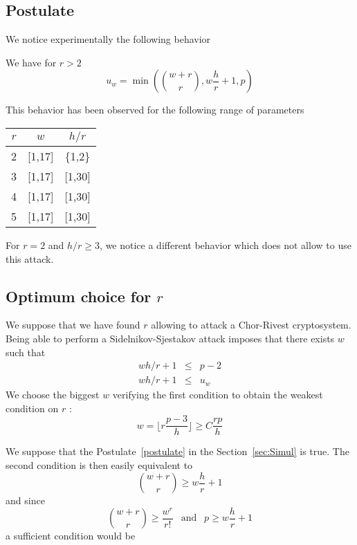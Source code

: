 \documentclass[a4paper]{article}
\begin{document}
\subsection{Postulate}

We notice experimentally the following behavior

\begin{postulate}
\label{postulate}
We have for $r > 2$
$$ u_w = \min \left( \binom{w+r}{r}, w\frac{h}{r} + 1 , p \right)$$
\end{postulate}

This behavior has been observed for the following range of parameters
\begin{center}
\begin{tabular}{|c|c|c|}
\hline
$r$ & $w$ 	& $h/r$ \\
\hline
2	& [1,17]	& \{1,2\}	\\
\hline
3	& [1,17]	& [1,30] \\
\hline
4	& [1,17]	& [1,30] \\
\hline
5	& [1,17]	& [1,30] \\
\hline
\end{tabular}
\end{center}


For $r = 2$ and $h/r \geq 3$, we notice a different behavior which does not allow to use this attack.


\subsection{Optimum choice for $r$}

We suppose that we have found $r$ allowing to attack a Chor-Rivest cryptosystem. Being able to perform a Sidelnikov-Sjestakov attack imposes that there exists $w$ such that
\begin{eqnarray*}
wh/r+1 &\leq & p-2 \\
wh/r+1 &\leq & u_w 
\end{eqnarray*}
We choose the biggest $w$ verifying the first condition to obtain the weakest condition on $r$ : $$ w = \lfloor r \frac{p-3}{h} \rfloor \geq C \frac{rp}{h} $$


We suppose that the Postulate~\ref{postulate} in the Section~\ref{sec:Simul} is true. The second condition is then easily equivalent to
$$ \binom{w+r}{r} \geq w\frac{h}{r}+1 $$
and since
$$ \binom{w+r}{r} \geq \frac{w^r}{r!} \ \ \text{ and } \ \ p \geq w\frac{h}{r}+1 $$
a sufficient condition would be


\end{document}
